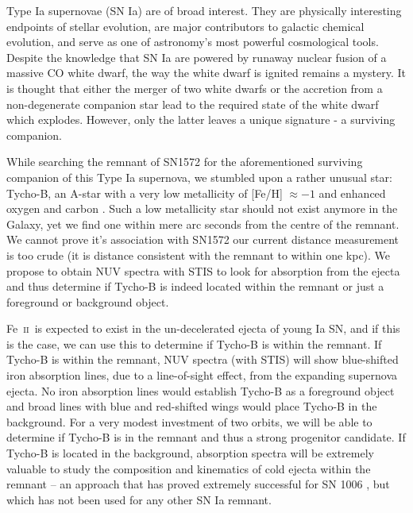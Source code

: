 \documentclass[12pt]{article}
\newcommand{\feii}{Fe~\textsc{ii}}
\begin{document}
%
%
\justification

Type Ia supernovae (SN Ia) are of broad interest. They are physically interesting endpoints of stellar evolution, are major contributors to galactic chemical evolution, and serve as one of astronomy's most powerful cosmological tools. 
Despite the knowledge that SN Ia are powered by runaway nuclear fusion of a massive CO white dwarf, the way the white dwarf is ignited remains a mystery. It is thought that either the merger of two white dwarfs or the accretion from a non-degenerate companion star lead to the required state of the white dwarf which explodes. However, only the latter leaves a unique signature - a surviving companion.

While searching the remnant of SN1572 for the aforementioned surviving companion of this Type Ia supernova,  we stumbled upon a rather unusual star: Tycho-B, an A-star with a very low metallicity of [Fe/H] $\approx -1$ and enhanced oxygen and carbon \citep{2012arXiv1210.2713K}. Such a low metallicity star should not exist anymore in the Galaxy, yet we find one within mere arc seconds from the centre of the remnant. We cannot prove it's association with SN1572 our current distance measurement is too crude (it is distance consistent with the remnant to within one kpc). We propose to obtain NUV spectra with STIS  to look for absorption from the ejecta and thus determine if Tycho-B is indeed located within the remnant or just a foreground or background object.

\feii\ is expected to exist in the un-decelerated ejecta of young Ia SN, and if this is the case, we can use this  to determine if Tycho-B is within the remnant.
If Tycho-B is within the remnant, NUV spectra (with STIS) will show blue-shifted iron absorption lines, due to a line-of-sight effect, from the expanding supernova ejecta. No iron absorption lines would establish Tycho-B as a foreground object and broad lines with blue and red-shifted wings would place Tycho-B in the background. For a very modest investment of two orbits, we will be able to determine if Tycho-B is in the remnant and thus a strong progenitor candidate. If Tycho-B is located in the background, absorption spectra will be extremely valuable to study the composition and kinematics of cold ejecta within the remnant -- an approach that has proved extremely successful for SN 1006 \citep[e.g.][]{1988ApJ...327..164F,1993ApJ...416..247W,2005ApJ...624..189W}, but which has not been used for any other SN Ia remnant.
\end{document}
